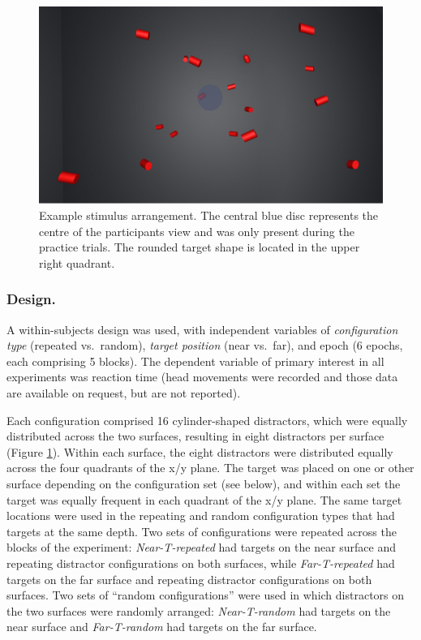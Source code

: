 \documentclass[
  english,
  man,floatsintext]{apa7}
\begin{document}
\begin{figure}

{\centering \includegraphics[width=0.6\linewidth]{fig_ExampleVR} 

}

\caption{Example stimulus arrangement. The central blue disc represents the centre of the participants view and was only present during the practice trials. The rounded target shape is located in the upper right quadrant.}\label{fig:task-example}
\end{figure}

\hypertarget{design.}{%
\subsubsection{Design.}\label{design.}}

A within-subjects design was used, with independent variables of \emph{configuration type} (repeated vs.~random), \emph{target position} (near vs.~far), and epoch (6 epochs, each comprising 5 blocks). The dependent variable of primary interest in all experiments was reaction time (head movements were recorded and those data are available on request, but are not reported).

Each configuration comprised 16 cylinder-shaped distractors, which were equally distributed across the two surfaces, resulting in eight distractors per surface (Figure \ref{fig:task-example}). Within each surface, the eight distractors were distributed equally across the four quadrants of the x/y plane. The target was placed on one or other surface depending on the configuration set (see below), and within each set the target was equally frequent in each quadrant of the x/y plane. The same target locations were used in the repeating and random configuration types that had targets at the same depth. Two sets of configurations were repeated across the blocks of the experiment: \emph{Near-T-repeated} had targets on the near surface and repeating distractor configurations on both surfaces, while \emph{Far-T-repeated} had targets on the far surface and repeating distractor configurations on both surfaces. Two sets of ``random configurations'' were used in which distractors on the two surfaces were randomly arranged: \emph{Near-T-random} had targets on the near surface and \emph{Far-T-random} had targets on the far surface.
\end{document}
